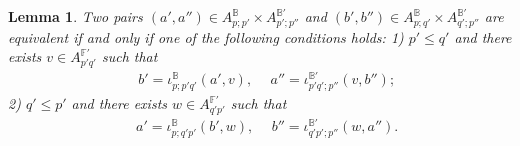 \documentclass[reqno, 10pt]{amsart}
\numberwithin{equation}{section}
\numberwithin{equation}{section}
\newtheorem{lemma}[thm]{Lemma}
\theoremstyle{definition}
\theoremstyle{remark}
\newcommand{\mb}{\mathbb}
\begin{document}
\begin{lemma}\label{lemma_concatenation_equivalence}
Two pairs $(a', a'') \in A_{p;p'}^{{\mb B}} \times A_{p';p''}^{{\mb B}'}$ and $(b', b'')\in A_{p;q'}^{{\mb B}} \times A_{q';p''}^{{\mb B}'}$ are equivalent if and only if one of the following conditions holds: 1) $p' \leq q'$ and there exists $v \in A_{p'q'}^{{\mb F}'}$ such that 
\begin{align*}
&\ b' = \iota_{p;p'q'}^{\mb B}(a', v),\ &\ a'' = \iota_{p'q'; p''}^{{\mb B}'}(v, b'');
\end{align*}
2) $q' \leq p'$ and there exists $w \in A_{q'p'}^{{\mb F}'}$ such that 
\begin{align*}
&\ a' = \iota_{p; q'p'}^{\mb B}(b', w),\ &\ b'' = \iota_{q'p'; p''}^{{\mb B}'} (w, a'').
\end{align*}
\end{lemma}
\end{document}
